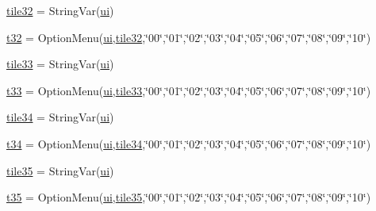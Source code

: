\begin{DoxyCompactItemize}
\item 
\mbox{\hyperlink{namespacegui_a54c6af9760148973c56dea68ffa9b9c7}{tile32}} = String\+Var(\mbox{\hyperlink{namespacegui_a40ab7281456eadbea2dc2038f5c24fa1}{ui}})
\item 
\mbox{\hyperlink{namespacegui_a8bc6d61d3e60b1279b71ce41f9caca91}{t32}} = Option\+Menu(\mbox{\hyperlink{namespacegui_a40ab7281456eadbea2dc2038f5c24fa1}{ui}},\mbox{\hyperlink{namespacegui_a54c6af9760148973c56dea68ffa9b9c7}{tile32}},\char`\"{}00\char`\"{},\char`\"{}01\char`\"{},\char`\"{}02\char`\"{},\char`\"{}03\char`\"{},\char`\"{}04\char`\"{},\char`\"{}05\char`\"{},\char`\"{}06\char`\"{},\char`\"{}07\char`\"{},\char`\"{}08\char`\"{},\char`\"{}09\char`\"{},\char`\"{}10\char`\"{})
\item 
\mbox{\hyperlink{namespacegui_aa338802b7dcd13afe3034f0bd6b4ac4e}{tile33}} = String\+Var(\mbox{\hyperlink{namespacegui_a40ab7281456eadbea2dc2038f5c24fa1}{ui}})
\item 
\mbox{\hyperlink{namespacegui_aef107f0e9e821704a733d1ac03809acd}{t33}} = Option\+Menu(\mbox{\hyperlink{namespacegui_a40ab7281456eadbea2dc2038f5c24fa1}{ui}},\mbox{\hyperlink{namespacegui_aa338802b7dcd13afe3034f0bd6b4ac4e}{tile33}},\char`\"{}00\char`\"{},\char`\"{}01\char`\"{},\char`\"{}02\char`\"{},\char`\"{}03\char`\"{},\char`\"{}04\char`\"{},\char`\"{}05\char`\"{},\char`\"{}06\char`\"{},\char`\"{}07\char`\"{},\char`\"{}08\char`\"{},\char`\"{}09\char`\"{},\char`\"{}10\char`\"{})
\item 
\mbox{\hyperlink{namespacegui_a4f827dfac57ca6256640fa244ffa1453}{tile34}} = String\+Var(\mbox{\hyperlink{namespacegui_a40ab7281456eadbea2dc2038f5c24fa1}{ui}})
\item 
\mbox{\hyperlink{namespacegui_a6dd7a7ae3f8df7267d965e3642251137}{t34}} = Option\+Menu(\mbox{\hyperlink{namespacegui_a40ab7281456eadbea2dc2038f5c24fa1}{ui}},\mbox{\hyperlink{namespacegui_a4f827dfac57ca6256640fa244ffa1453}{tile34}},\char`\"{}00\char`\"{},\char`\"{}01\char`\"{},\char`\"{}02\char`\"{},\char`\"{}03\char`\"{},\char`\"{}04\char`\"{},\char`\"{}05\char`\"{},\char`\"{}06\char`\"{},\char`\"{}07\char`\"{},\char`\"{}08\char`\"{},\char`\"{}09\char`\"{},\char`\"{}10\char`\"{})
\item 
\mbox{\hyperlink{namespacegui_a890f018d64e439ac53ae9d4a3db07d11}{tile35}} = String\+Var(\mbox{\hyperlink{namespacegui_a40ab7281456eadbea2dc2038f5c24fa1}{ui}})
\item 
\mbox{\hyperlink{namespacegui_ad633cf87dc68dca3c96ab4d2ab83ac6b}{t35}} = Option\+Menu(\mbox{\hyperlink{namespacegui_a40ab7281456eadbea2dc2038f5c24fa1}{ui}},\mbox{\hyperlink{namespacegui_a890f018d64e439ac53ae9d4a3db07d11}{tile35}},\char`\"{}00\char`\"{},\char`\"{}01\char`\"{},\char`\"{}02\char`\"{},\char`\"{}03\char`\"{},\char`\"{}04\char`\"{},\char`\"{}05\char`\"{},\char`\"{}06\char`\"{},\char`\"{}07\char`\"{},\char`\"{}08\char`\"{},\char`\"{}09\char`\"{},\char`\"{}10\char`\"{})

\end{DoxyCompactItemize}
